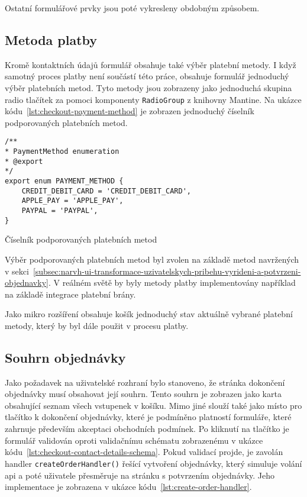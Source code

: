 Ostatní formulářové prvky jsou poté vykresleny obdobným způsobem.

\subsection{Metoda platby}
\label{subsec:implementace-checkout-payment-method}
Kromě kontaktních údajů formulář obsahuje také výběr platební metody.
I když samotný proces platby není součástí této práce, obsahuje formulář jednoduchý výběr platebních metod.
Tyto metody jsou zobrazeny jako jednoduchá skupina radio tlačítek za pomoci komponenty \texttt{RadioGroup} z knihovny Mantine.
Na ukázce kódu~\ref{lst:checkout-payment-method} je zobrazen jednoduchý číselník podporovaných platebních metod.

\begin{listing}[h]
\begin{verbatim}
/**
* PaymentMethod enumeration
* @export
*/
export enum PAYMENT_METHOD {
	CREDIT_DEBIT_CARD = 'CREDIT_DEBIT_CARD',
	APPLE_PAY = 'APPLE_PAY',
	PAYPAL = 'PAYPAL',
}
\end{verbatim}
\caption{Číselník podporovaných platebních metod}
\label{lst:checkout-payment-method}
\end{listing}

Výběr podporovaných platebních metod byl zvolen na základě metod navržených v sekci~\ref{subsec:narvh-ui-transformace-uzivatelskych-pribehu-vyrideni-a-potvrzeni-objednavky}.
V reálném světě by byly metody platby implementovány například na základě integrace platební brány.

Jako mikro rozšíření obsahuje košík jednoduchý stav aktuálně vybrané platební metody, který by byl dále použit v procesu platby.

\subsection{Souhrn objednávky}
\label{subsec:implementace-checkout-souhrn}
Jako požadavek na uživatelské rozhraní bylo stanoveno, že stránka dokončení objednávky musí obsahovat její souhrn.
Tento souhrn je zobrazen jako karta obsahující seznam všech vstupenek v košíku.
Mimo jiné slouží také jako místo pro tlačítko k dokončení objednávky, které je podmíněno platností formuláře, které zahrnuje především akceptaci obchodních podmínek.
Po kliknutí na tlačítko je formulář validován oproti validačnímu schématu zobrazenému v ukázce kódu~\ref{lst:checkout-contact-details-schema}.
Pokud validací projde, je zavolán handler \texttt{createOrderHandler()} řešící vytvoření objednávky, který simuluje volání \ac{api} a poté uživatele přesměruje na stránku s potvrzením objednávky.
Jeho implementace je zobrazena v ukázce kódu~\ref{lst:create-order-handler}.

